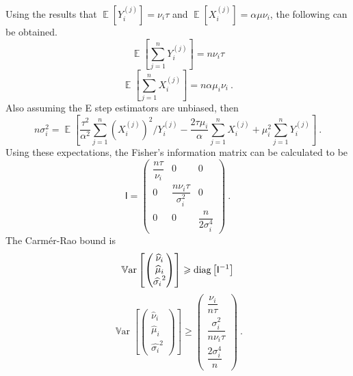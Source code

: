 \documentclass[12pt]{report}
\DeclareMathOperator{\expectation}{\mathbb{E}}
\DeclareMathOperator{\variance}{\mathbb{V}ar}
\newcommand{\matr}[1]{\mathsf{#1}}
\begin{document}
Using the results that $\expectation\left[Y_i^{(j)}\right]=\nu_i\tau$ and $\expectation\left[X_i^{(j)}\right]=\alpha\mu\nu_i$, the following can be obtained.
\begin{equation}
\expectation\left[\sum_{j=1}^nY_i^{(j)}\right] = n\nu_i\tau
\end{equation}
\begin{equation}
\expectation\left[\sum_{j=1}^nX_i^{(j)}\right] = n\alpha \mu_i \nu_i \ .
\end{equation}
Also assuming the E step estimators are unbiased, then
\begin{equation}
n\sigma_i^2 = \expectation\left[\dfrac{\tau^2}{\alpha^2}\sum_{j=1}^n\left(X_i^{(j)}\right)^2/Y_i^{(j)}-\dfrac{2\tau\mu_i}{\alpha}\sum_{j=1}^nX_i^{(j)}+\mu_i^2\sum_{j=1}^nY_i^{(j)}\right] \ .
\end{equation}
Using these expectations, the Fisher's information matrix can be calculated to be
\begin{equation}
\matr{I} = 
\begin{pmatrix}
\dfrac{n\tau}{\nu_i} & 0 & 0
\\
0 & \dfrac{n\nu_i\tau}{\sigma_i^2} & 0 
\\
0 & 0 & \dfrac{n}{2\sigma_i^4}
\end{pmatrix} \ .
\end{equation}
The Carm\'er-Rao bound is
\begin{equation}
\variance\left[\begin{pmatrix}
\widehat{\nu}_i \\ \widehat{\mu}_i \\ \widehat{\sigma_i}^2
\end{pmatrix}\right]
\geqslant
\textup{diag}\left[\matr{I}^{-1}\right]
\end{equation}
\begin{equation}
\variance\left[\begin{pmatrix}
\widehat{\nu}_i \\ \widehat{\mu}_i \\ \widehat{\sigma_i}^2
\end{pmatrix}\right]
\geqslant
\begin{pmatrix}
\dfrac{\nu_i}{n\tau} \\[10pt] \dfrac{\sigma_i^2}{n\nu_i\tau} \\[10pt] \dfrac{2\sigma_i^4}{n}
\end{pmatrix} \ .
\end{equation}



\end{document}
